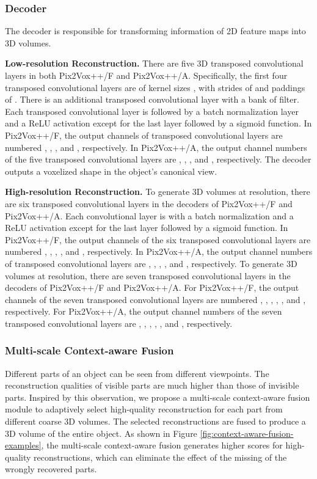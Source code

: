 \documentclass[twocolumn]{svjour3}
\begin{document}
\subsubsection{Decoder}

The decoder is responsible for transforming information of 2D feature maps into 3D volumes.

\noindent \textbf{Low-resolution Reconstruction.}
There are five 3D transposed convolutional layers in both Pix2Vox++/F and Pix2Vox++/A.
Specifically, the first four transposed convolutional layers are of kernel sizes , with strides of  and paddings of .
There is an additional transposed convolutional layer with a bank of  filter.
Each transposed convolutional layer is followed by a batch normalization layer and a ReLU activation except for the last layer followed by a sigmoid function.
In Pix2Vox++/F, the output channels of transposed convolutional layers are numbered , , ,  and , respectively.
In Pix2Vox++/A, the output channel numbers of the five transposed convolutional layers are , , ,  and , respectively.
The decoder outputs a  voxelized shape in the object's canonical view.

\noindent \textbf{High-resolution Reconstruction.}
To generate 3D volumes at  resolution, there are six transposed convolutional layers in the decoders of Pix2Vox++/F and Pix2Vox++/A.
Each convolutional layer is with a batch normalization and a ReLU activation except for the last layer followed by a sigmoid function.
In Pix2Vox++/F, the output channels of the six transposed convolutional layers are numbered , , , ,  and , respectively.
In Pix2Vox++/A, the output channel numbers of transposed convolutional layers are , , , ,  and , respectively.
To generate 3D volumes at  resolution, there are seven transposed convolutional layers in the decoders of Pix2Vox++/F and Pix2Vox++/A.
For Pix2Vox++/F, the output channels of the seven transposed convolutional layers are numbered , , , , ,  and , respectively.
For Pix2Vox++/A, the output channel numbers of the seven transposed convolutional layers are , , , , ,  and , respectively.

\subsubsection{Multi-scale Context-aware Fusion}

Different parts of an object can be seen from different viewpoints.
The reconstruction qualities of visible parts are much higher than those of invisible parts.
Inspired by this observation, we propose a multi-scale context-aware fusion module to adaptively select high-quality reconstruction for each part from different coarse 3D volumes.
The selected reconstructions are fused to produce a 3D volume of the entire object.
As shown in Figure \ref{fig:context-aware-fusion-examples}, the multi-scale context-aware fusion generates higher scores for high-quality reconstructions, which can eliminate the effect of the missing of the wrongly recovered parts.
\end{document}
